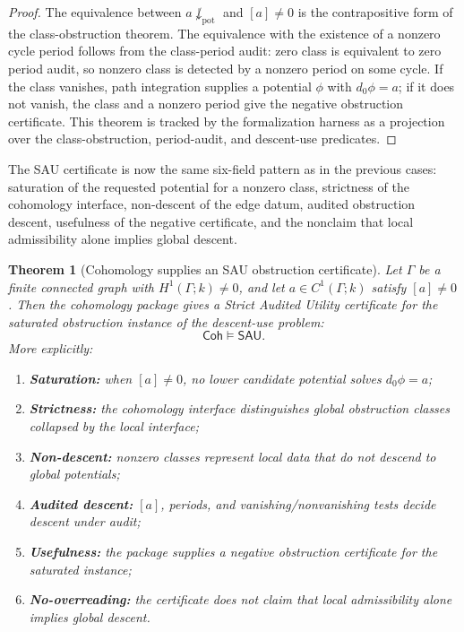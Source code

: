 \documentclass[11pt]{article}
\newtheorem{theorem}{Theorem}[section]
\theoremstyle{definition}
\begin{document}
\begin{proof}
The equivalence between \(a\not\downarrow_{\mathrm{pot}}\) and \([a]\neq0\) is
the contrapositive form of the class-obstruction theorem.  The equivalence with
the existence of a nonzero cycle period follows from the class-period audit:
zero class is equivalent to zero period audit, so nonzero class is detected by a
nonzero period on some cycle.  If the class vanishes, path integration supplies a
potential \(\phi\) with \(d_0\phi=a\); if it does not vanish, the class and a
nonzero period give the negative obstruction certificate.  This theorem is
tracked by the formalization harness as a projection over the class-obstruction,
period-audit, and descent-use predicates.
\end{proof}

The SAU certificate is now the same six-field pattern as in the previous cases:
saturation of the requested potential for a nonzero class, strictness of the
cohomology interface, non-descent of the edge datum, audited obstruction descent,
usefulness of the negative certificate, and the nonclaim that local admissibility
alone implies global descent.

\begin{theorem}[Cohomology supplies an SAU obstruction certificate]
\label{thm:coh-sau-certificate}
Let \(\Gamma\) be a finite connected graph with \(H^1(\Gamma;k)\neq0\), and let \(a\in C^1(\Gamma;k)\) satisfy \([a]\neq0\).  Then the cohomology package gives a Strict Audited Utility certificate for the saturated obstruction instance of the descent-use problem:
\[
\mathsf{Coh}\models\mathsf{SAU}.
\]
More explicitly:
\begin{enumerate}
\item \textbf{Saturation:} when \([a]\neq0\), no lower candidate potential solves \(d_0\phi=a\);
\item \textbf{Strictness:} the cohomology interface distinguishes global obstruction classes collapsed by the local interface;
\item \textbf{Non-descent:} nonzero classes represent local data that do not descend to global potentials;
\item \textbf{Audited descent:} \([a]\), periods, and vanishing/nonvanishing tests decide descent under audit;
\item \textbf{Usefulness:} the package supplies a negative obstruction certificate for the saturated instance;
\item \textbf{No-overreading:} the certificate does not claim that local admissibility alone implies global descent.
\end{enumerate}
\end{theorem}
\end{document}
